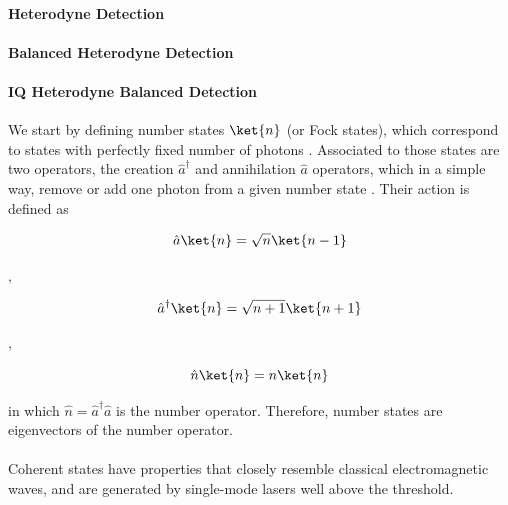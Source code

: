\paragraph{Heterodyne Detection}

\paragraph{Balanced Heterodyne Detection}

\paragraph{IQ Heterodyne Balanced Detection}



We start by defining number states $\ket{n}$ (or Fock states), which correspond to states with perfectly fixed number of photons
\cite{loudon2000}.
Associated to those states are two operators, the creation $\hat{a}^\dagger$ and annihilation $\hat{a}$ operators, which in a simple way, remove or add one photon from a given number state
\cite{fox2006}.
Their action is defined as
%
\begin{center}
	\hspace{-4mm}
	\begin{minipage}{44mm}
		\noindent
		\begin{equation}
			\hat{a} \ket{n} = \sqrt{n} \ket{n-1}
		\end{equation}
	\end{minipage}
	$,\quad$
	\begin{minipage}{52mm}
		\noindent
		\begin{equation}
			\hat{a}^\dagger \ket{n} = \sqrt{n+1} \ket{n+1}
		\end{equation}
	\end{minipage}
	$,\quad$
	\begin{minipage}{35mm}
		\noindent
		\begin{equation}
			\hat{n} \ket{n} = n \ket{n}
		\end{equation}
	\end{minipage}
\end{center}
%
in which $\hat{n} = \hat{a}^\dagger\hat{a}$ is the number operator. Therefore, number states are eigenvectors of the number operator.\\
\\
Coherent states have properties that closely resemble classical electromagnetic waves, and are generated by single-mode lasers well above the threshold.
